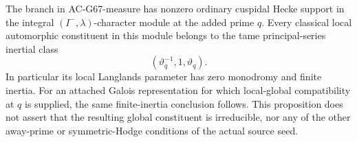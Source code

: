 \begin{proposition}
\label{AC-G67-type}
The branch in AC-G67-measure has nonzero ordinary cuspidal
Hecke support in the integral $(I^-,\lambda)$-character
module at the added prime $q$.  Every classical local
automorphic constituent in this module belongs to the tame
principal-series inertial class
\[
                (\vartheta_q^{-1},1,\vartheta_q).         \tag{G67.11}
\]
In particular its local Langlands parameter has zero
monodromy and finite inertia.  For an attached Galois
representation for which local-global compatibility at $q$
is supplied, the same finite-inertia conclusion follows.
This proposition does not assert that the resulting global
constituent is irreducible, nor any of the other away-prime
or symmetric-Hodge conditions of the actual source seed.
\end{proposition}
